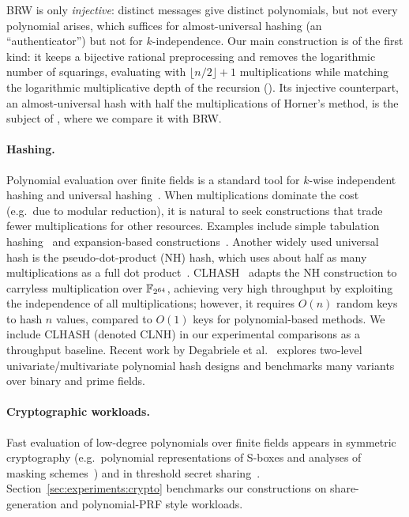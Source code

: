 BRW is only \emph{injective}: distinct messages give distinct polynomials, but not every polynomial arises, which suffices for almost-universal hashing (an ``authenticator'') but not for $k$-independence.
Our main construction is of the first kind: it keeps a bijective rational preprocessing and removes the logarithmic number of squarings, evaluating with $\lfloor n/2\rfloor+1$ multiplications while matching the logarithmic multiplicative depth of the recursion ().
Its injective counterpart, an almost-universal hash with half the multiplications of Horner's method, is the subject of , where we compare it with BRW.

\paragraph{Hashing.}
Polynomial evaluation over finite fields is a standard tool for $k$-wise independent hashing and universal hashing~\cite{wegman1981new}.
When multiplications dominate the cost (e.g.\ due to modular reduction), it is natural to seek constructions that trade fewer multiplications for other resources.
Examples include simple tabulation hashing~\cite{patracscu2012power} and expansion-based constructions~\cite{christiani2015independence}.
Another widely used universal hash is the pseudo-dot-product (NH) hash, which uses about half as many multiplications as a full dot product~\cite{winograd1968new, black1999umac}.
CLHASH~\cite{lemire2015clhash} adapts the NH construction to carryless multiplication over $\mathbb{F}_{2^{64}}$,
achieving very high throughput by exploiting the independence of all multiplications;
however, it requires $O(n)$ random keys to hash $n$ values, compared to $O(1)$ keys for polynomial-based methods.
We include CLHASH (denoted CLNH) in our experimental comparisons as a throughput baseline.
Recent work by Degabriele et al.~\cite{degabriele2026multivariate} explores two-level univariate/multivariate polynomial hash designs and benchmarks many variants over binary and prime fields.

\paragraph{Cryptographic workloads.}
Fast evaluation of low-degree polynomials over finite fields appears in symmetric cryptography (e.g.\ polynomial representations of S-boxes and analyses of masking schemes~\cite{DBLP:conf/fse/CarletGPQR12}) and in threshold secret sharing~\cite{shamir1979share}.
Section~\ref{sec:experiments:crypto} benchmarks our constructions on share-generation and polynomial-PRF style workloads.
